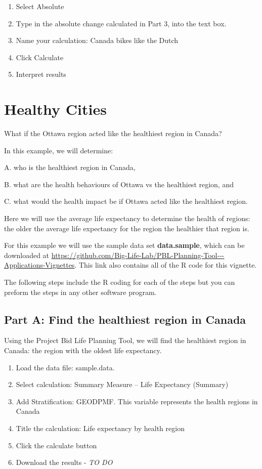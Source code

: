 \documentclass[]{book}
\begin{document}
\begin{enumerate}
\def\labelenumi{\arabic{enumi}.}
\setcounter{enumi}{5}
\item
  Select Absolute
\item
  Type in the absolute change calculated in Part 3, into the text box.
\item
  Name your calculation: Canada bikes like the Dutch
\item
  Click Calculate
\item
  Interpret results
\end{enumerate}

\section{Healthy Cities}\label{healthy-cities}

What if the Ottawa region acted like the healthiest region in Canada?

In this example, we will determine:

A. who is the healthiest region in Canada,

B. what are the health behaviours of Ottawa vs the healthiest region,
and

C. what would the health impact be if Ottawa acted like the healthiest
region.

Here we will use the average life expectancy to determine the health of
regions: the older the average life expectancy for the region the
healthier that region is.

For this example we will use the sample data set \textbf{data.sample},
which can be downloaded at
\url{https://github.com/Big-Life-Lab/PBL-Planning-Tool---Applications-Vignettes}.
This link also contains all of the R code for this vignette.

The following steps include the R coding for each of the steps but you
can preform the steps in any other software program.

\subsection{Part A: Find the healthiest region in
Canada}\label{part-a-find-the-healthiest-region-in-canada}

Using the Project Bid Life Planning Tool, we will find the healthiest
region in Canada: the region with the oldest life expectancy.

\begin{enumerate}
\def\labelenumi{\arabic{enumi}.}
\item
  Load the data file: sample.data.
\item
  Select calculation: Summary Measure -- Life Expectancy (Summary)
\item
  Add Stratification: GEODPMF. This variable represents the health
  regions in Canada
\item
  Title the calculation: Life expectancy by health region
\item
  Click the calculate button
\item
  Download the results - \emph{TO DO}
\end{enumerate}
\end{document}
